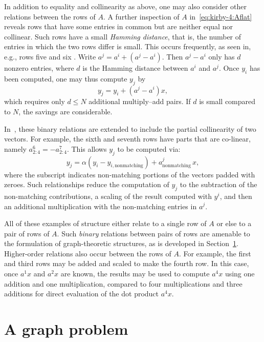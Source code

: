 In addition to equality and collinearity as above, one may also
consider other relations between the rows of $A$. A further inspection
of $A$ in~\eqref{eq:kirby-4:Aflat} reveals rows that have some entries
in common but are neither equal nor collinear. Such rows have a small
\emph{Hamming distance}, that is, the number of entries in which the
two rows differ is small. This occurs frequently, as seen in, e.g.,
rows five and six . Write $ a^j = a^i + (a^j-a^i) $. Then $ a^j -a^i $
only has $ d $ nonzero entries, where $d$ is the Hamming distance
between $a^i$ and $a^j$.  Once $ y_i $ has been computed, one may thus
compute $y_j$ by
\begin{equation}
y_j = y_i + \left( a^j - a^i \right) x,
\end{equation}
which requires only $ d \leq N $ additional multiply--add pairs. If
$ d $ is small compared to $ N $, the savings are considerable.

In~\cite{WolfHeath2009}, these binary relations are extended to
include the partial collinearity of two vectors.  For example, the
sixth and seventh rows have parts that are co-linear, namely
$a^6_{2:4} = - a^7_{2:4}$.  This allows $y_j$ to be computed via:
\begin{equation}
  y_j = \alpha(y_i - y_{i,\mathrm{nonmatching}}) + a^j_{\mathrm{nonmatching}} \, x,
\end{equation}
where the subscript indicates non-matching portions of the vectors
padded with zeroes. Such relationships reduce the computation of $y_j$
to the subtraction of the non-matching contributions, a scaling of the
result computed with $y^i$, and then an additional multiplication with
the non-matching entries in $a^j$.

All of these examples of structure either relate to a single row of $
A $ or else to a pair of rows of $ A $. Such \emph{binary} relations
between pairs of rows are amenable to the formulation of
graph-theoretic structures, as is developed in
Section~\ref{sec:kirby-4:graph}. Higher-order relations also occur
between the rows of $ A $.  For example, the first and third rows may
be added and scaled to make the fourth row.  In this case, once $ a^1
x $ and $ a^2 x $ are known, the results may be used to compute $
a^{4} x $ using one addition and one multiplication, compared to four
multiplications and three additions for direct evaluation of the dot
product $a^{4} x$.

\section{A graph problem}
\label{sec:kirby-4:graph}

